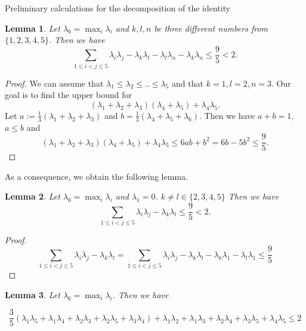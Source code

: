 \documentclass[12pt]{article}
\newtheorem{lemma}{Lemma}[section]
\begin{document}
\begin{section}{Preliminary calculations for the decomposition of the identity }
    \begin{lemma}
    \label{lemma3.4}
        Let $\lambda_{6} = \max_{i}\lambda_{i}$ and $k,l,n$ be three different  numbers from $\{1,2,3,4,5\}$. Then we have 
        $$
            \sum_{1\leq i<j\leq 5}\lambda_{i}\lambda_{j} - \lambda_{k}\lambda_{l} - \lambda_{l}\lambda_{n} - \lambda_{k}\lambda_{n}\leq \frac{9}{5} < 2.
        $$
    \end{lemma}
    
    \begin{proof}
        We can assume that $\lambda_{1}\leq \lambda_{2}\leq .. \leq \lambda_{5}$ and that $k=1, l=2, n=3$. Our goal is to find the upper bound for 
        $$          (\lambda_{1}+\lambda_{2}+\lambda_{3})(\lambda_{4}+\lambda_{5}) + \lambda_{4}\lambda_{5}.
        $$
        Let $a := \frac{1}{3}(\lambda_{1} + \lambda_{2} + \lambda_{3})$ and $b = \frac{1}{3}(\lambda_{4} + \lambda_{5} + \lambda_{6})$. Then we have $a + b = 1 ,$ $a\leq b$ and 
        $$
            (\lambda_{1}+\lambda_{2}+\lambda_{3})(\lambda_{4}+\lambda_{5}) + \lambda_{4}\lambda_{5} \leq 6ab + b^2 = 6b - 5b^2 \leq \frac{9}{5}.
        $$
       
        
    \end{proof}
    As a consequence, we obtain the following lemma. 
     \begin{lemma}
    \label{lemma3.5}
         Let $\lambda_{6} = \max_{i}\lambda_{i}$ and $\lambda_{1}=0$. $k\neq l \in \{2,3,4,5\}$ Then we have 
         $$
            \sum_{1\leq i<j\leq 5}\lambda_{i}\lambda_{j}  - \lambda_{k}\lambda_{l} \leq \frac{9}{5} 
 < 2.
         $$
    \end{lemma}

    \begin{proof}
          $$
            \sum_{1\leq i<j\leq 5}\lambda_{i}\lambda_{j}  - \lambda_{k}\lambda_{l} = \sum_{1\leq i<j\leq 5}\lambda_{i}\lambda_{j}  - \lambda_{k}\lambda_{l} - \lambda_{k}\lambda_{1} - \lambda_{l} \lambda_{1}  \leq \frac{9}{5} 
         $$
    \end{proof}

    \begin{lemma}
    \label{lemma3.6}
         Let $\lambda_{6} = \max_{i}\lambda_{i}$. Then we have
         
        $$
           \frac{3}{5}(\lambda_{1}\lambda_{5} + \lambda_{1}\lambda_{4} +\lambda_{2}\lambda_{3} + \lambda_{2}\lambda_{5} + \lambda_{3}\lambda_{4} ) + \lambda_{1}\lambda_{2} + \lambda_{1}\lambda_{3} + \lambda_{2}\lambda_{4} +\lambda_{3}\lambda_{5} + \lambda_{4}\lambda_{5} \leq 2
        $$
    \end{lemma}


\end{section}
\end{document}
